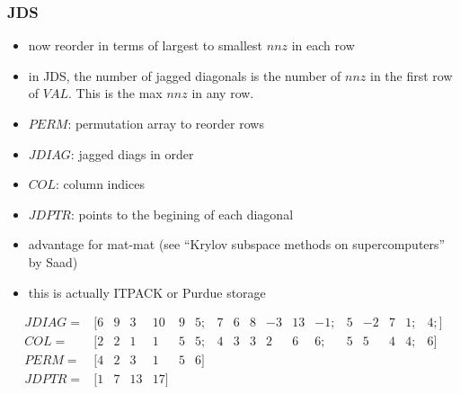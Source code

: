 \documentclass[10pt]{beamer}
\begin{document}
\begin{frame}
\frametitle{JDS}
  \begin{itemize}
    \item now reorder in terms of largest to smallest $nnz$ in each row
    \item in JDS, the number of jagged diagonals is the number of $nnz$
in the first row of $VAL$.  This is the max $nnz$ in any row.
    \item $PERM$: permutation array to reorder rows
    \item $JDIAG$: jagged diags in order
    \item $COL$: column indices
    \item $JDPTR$: points to the begining of each diagonal
    \item advantage for mat-mat (see ``Krylov subspace methods on
supercomputers'' by Saad)
    \item this is actually ITPACK or Purdue storage
  \end{itemize}
\begin{equation*}
\begin{array}{llllllllllllllllll}
JDIAG = &[ 6 & 9 & 3 & 10 & 9 & 5; & 7 & 6 & 8 & -3 & 13 & -1; & 5 & -2 & 7 & 1; & 4;]\\
COL =   &[ 2 & 2 & 1 & 1 & 5 & 5; & 4 &3 & 3 & 2 & 6 & 6; & 5 & 5 &4 & 4; & 6 ]\\
PERM  = &[ 4 & 2 &3 &1 &5 &6] & & & & & & & & & & &\\
JDPTR  = &[ 1 & 7 &13 & 17] & & & & & & & & & & & & &\\
\end{array}
\end{equation*}
\end{frame}
\end{document}
